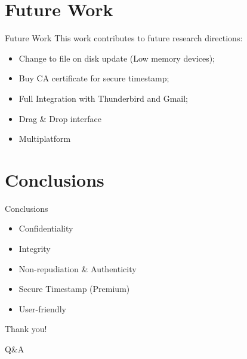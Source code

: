 \section{Future Work}
\begin{frame}{Future Work}
This work contributes to future research directions:
\begin{itemize}
	\item Change to file on disk update (Low memory devices);
	\item Buy CA certificate for secure timestamp;
	\item Full Integration with Thunderbird and Gmail;
	\item Drag \& Drop interface
	\item Multiplatform
\end{itemize}
\end{frame}


\section{Conclusions}
\begin{frame}{Conclusions}
\begin{itemize}
\item Confidentiality
\item Integrity
\item Non-repudiation \& Authenticity
\item Secure Timestamp (Premium)
\item User-friendly
\end{itemize}
\end{frame}
		
\begin{frame}
\begin{center}
\huge Thank you!
\vspace{0.5cm}

\Large Q\&A
\end{center}
\end{frame}


